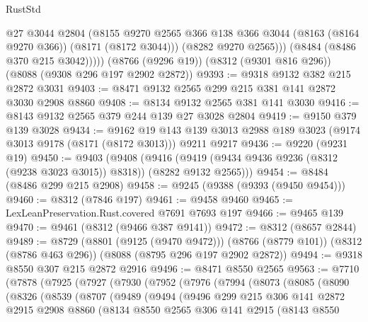 \begin{lexlean}{RustStd}
\begin{coremodule}
              @27
              @3044
              @2804
              (@8155
                @9270
                @2565
                @366
                @138
                @366
                @3044
                (@8163 (@8164 @9270 @366))
                (@8171 (@8172 @3044)))
              (@8282 @9270 @2565)))
          (@8484 (@8486 @370 @215 @3042)))))
    (@8766 (@9296 @19))
    (@8312 (@9301 @816 @296))
    (@8088 (@9308 @296 @197 @2902 @2872))
@9393 := @9318 @9132 @382 @215 @2872 @3031
@9403 := @8471 @9132 @2565 @299 @215 @381 @141 @2872 @3030 @2908 @8860
@9408 := @8134 @9132 @2565 @381 @141 @3030
@9416 := @8143 @9132 @2565 @379 @244 @139 @27 @3028 @2804
@9419 := @9150 @379 @139 @3028
@9434 := @9162
    @19
    @143
    @139
    @3013
    @2988
    @189
    @3023
    (@9174 @3013 @9178 (@8171 (@8172 @3013)))
    @9211
    @9217
@9436 := @9220 (@9231 @19)
@9450 := @9403
    (@9408
      (@9416 (@9419 (@9434 @9436 @9236 (@8312 (@9238 @3023 @3015)) @8318)) (@8282 @9132 @2565)))
@9454 := @8484 (@8486 @299 @215 @2908)
@9458 := @9245 (@9388 (@9393 (@9450 @9454)))
@9460 := @8312 (@7846 @197)
@9461 := @9458 @9460
@9465 := LexLeanPreservation.Rust.covered @7691 @7693 @197
@9466 := @9465 @139
@9470 := @9461 (@8312 (@9466 @387 @9141))
@9472 := @8312 (@8657 @2844)
@9489 := @8729
    (@8801 (@9125 (@9470 @9472)))
    (@8766 (@8779 @101))
    (@8312 (@8786 @463 @296))
    (@8088 (@8795 @296 @197 @2902 @2872))
@9494 := @9318 @8550 @307 @215 @2872 @2916
@9496 := @8471 @8550 @2565
@9563 := @7710
    (@7878
      (@7925
        (@7927
          (@7930
            (@7952
              (@7976
                (@7994
                  (@8073
                    (@8085
                      (@8090
                        (@8326
                          (@8539
                            (@8707
                              (@9489
                                (@9494
                                  (@9496
                                    @299
                                    @215
                                    @306
                                    @141
                                    @2872
                                    @2915
                                    @2908
                                    @8860
                                    (@8134
                                      @8550
                                      @2565
                                      @306
                                      @141
                                      @2915
                                      (@8143
                                        @8550

\end{coremodule}
\end{lexlean}
